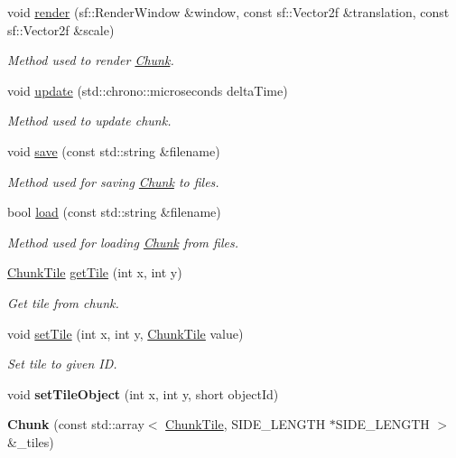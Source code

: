 \begin{DoxyCompactItemize}
\item 
void \hyperlink{classChunk_a0353e35c14d4f576542660bb762db51f}{render} (sf\-::\-Render\-Window \&window, const sf\-::\-Vector2f \&translation, const sf\-::\-Vector2f \&scale)
\begin{DoxyCompactList}\small\item\em Method used to render \hyperlink{classChunk}{Chunk}. \end{DoxyCompactList}\item 
void \hyperlink{classChunk_aa794fcda8fe859680cbfe4a2bcd5d097}{update} (std\-::chrono\-::microseconds delta\-Time)
\begin{DoxyCompactList}\small\item\em Method used to update chunk. \end{DoxyCompactList}\item 
void \hyperlink{classChunk_ac3e70286e057eb0f93accec639047097}{save} (const std\-::string \&filename)
\begin{DoxyCompactList}\small\item\em Method used for saving \hyperlink{classChunk}{Chunk} to files. \end{DoxyCompactList}\item 
bool \hyperlink{classChunk_afa9fe7d9713cbf4fbe75520dd760880a}{load} (const std\-::string \&filename)
\begin{DoxyCompactList}\small\item\em Method used for loading \hyperlink{classChunk}{Chunk} from files. \end{DoxyCompactList}\item 
\hyperlink{classChunkTile}{Chunk\-Tile} \hyperlink{classChunk_a1246a3c50c305dca427ca51f438d1336}{get\-Tile} (int x, int y)
\begin{DoxyCompactList}\small\item\em Get tile from chunk. \end{DoxyCompactList}\item 
void \hyperlink{classChunk_ab5533469c17720e23b3b83d219536fc5}{set\-Tile} (int x, int y, \hyperlink{classChunkTile}{Chunk\-Tile} value)
\begin{DoxyCompactList}\small\item\em Set tile to given I\-D. \end{DoxyCompactList}\item 
\hypertarget{classChunk_a56ac4e5e5095c8675b8b87403a26bb65}{void {\bfseries set\-Tile\-Object} (int x, int y, short object\-Id)}\label{classChunk_a56ac4e5e5095c8675b8b87403a26bb65}

\item 
\hypertarget{classChunk_a39d2b4d73d01932ad31dbb0b4c2597ea}{{\bfseries Chunk} (const std\-::array$<$ \hyperlink{classChunkTile}{Chunk\-Tile}, S\-I\-D\-E\-\_\-\-L\-E\-N\-G\-T\-H $\ast$S\-I\-D\-E\-\_\-\-L\-E\-N\-G\-T\-H $>$ \&\-\_\-tiles)}\label{classChunk_a39d2b4d73d01932ad31dbb0b4c2597ea}

\end{DoxyCompactItemize}
